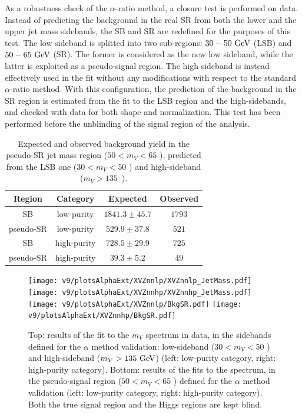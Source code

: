 \vspace*{1\baselineskip}

\noindent As a robustness check of the $\alpha$-ratio method, a closure test is performed on data. Instead of predicting the background in the real SR from both the lower and the upper jet mass sidebands, the SB and SR are redefined for the purposes of this test. The low sideband is splitted into two sub-regions: $30-50~\text{GeV}$ (LSB) and $50-65~\text{GeV}$ (SR). The former is considered as the new low sideband, while the latter is exploited as a pseudo-signal region. The high sideband is instead effectively used in the fit without any modifications with respect to the standard $\alpha$-ratio method. With this configuration, the prediction of the background in the SR region is estimated from the fit to the LSB region and the high-sidebands, and checked with data for both shape and normalization. This test has been performed before the unblinding of the signal region of the analysis.

\begin{table}[!htb]
  \begin{center}
  \caption{Expected and observed background yield in the pseudo-SR jet mass region ($ 50 < m_V < 65$ \GeV), predicted from the LSB one ($30 < m_V < 50$ \GeV) and high-sideband ($m_V > 135$~\GeV).}\label{tab:alphaClosure}
    \begin{tabular}{cc|cc}
      Region & Category & Expected & Observed \\
      \hline
      \hline
      SB & low-purity & $1841.3 \pm 45.7$ & $1793$ \\
      pseudo-SR & low-purity & $529.9 \pm 37.8$ & $521$ \\
      \hdashline
      SB & high-purity & $728.5 \pm 29.9$ & $725$ \\
      pseudo-SR & high-purity & $39.3 \pm 5.2$ & $49$ \\
    \end{tabular}
  \end{center}

\end{table}

\begin{figure}[!htb]
  \centering
    \texttt{[image: v9/plotsAlphaExt/XVZnnlp/XVZnnlp\_JetMass.pdf]}
    \texttt{[image: v9/plotsAlphaExt/XVZnnhp/XVZnnhp\_JetMass.pdf]}
    \\
    \texttt{[image: v9/plotsAlphaExt/XVZnnlp/BkgSR.pdf]}%
    \texttt{[image: v9/plotsAlphaExt/XVZnnhp/BkgSR.pdf]}%
  \caption{Top: results of the fit to the $m_V$ spectrum in data, in the sidebands defined for the $\alpha$ method validation: low-sideband ($30 < m_V < 50$ \GeV) and high-sideband ($m_V > 135~\text{GeV}$) (left: low-purity category, right: high-purity category). Bottom: results of the fits to the \mtVZ spectrum, in the pseudo-signal region ($50 < m_V < 65$ \GeV) defined for the $\alpha$ method validation (left: low-purity category, right: high-purity category). Both the true signal region and the Higgs regions are kept blind.}
  \label{fig:alphaClosure}
\end{figure}

